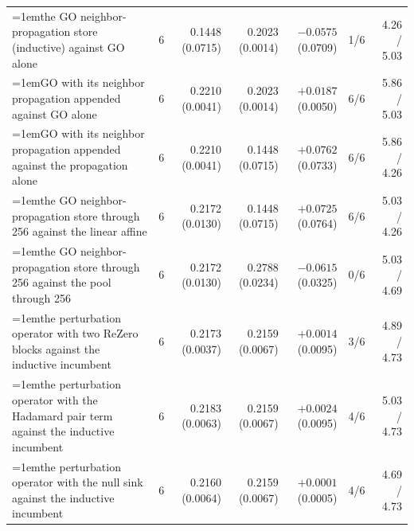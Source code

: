 \begin{table}[H]
\begin{tabular}{@{}>{\raggedright\hangindent=1em\hangafter=1\arraybackslash}p{78.5mm}rrrrrr@{}}
    the GO neighbor-propagation store (inductive) against GO alone & 6 & 0.1448 (0.0715) & 0.2023 (0.0014) & $-0.0575$ (0.0709) & 1/6 & 4.26 / 5.03 \\
    GO with its neighbor propagation appended against GO alone & 6 & 0.2210 (0.0041) & 0.2023 (0.0014) & $+0.0187$ (0.0050) & 6/6 & 5.86 / 5.03 \\
    GO with its neighbor propagation appended against the propagation alone & 6 & 0.2210 (0.0041) & 0.1448 (0.0715) & $+0.0762$ (0.0733) & 6/6 & 5.86 / 4.26 \\
    the GO neighbor-propagation store through 256 against the linear affine & 6 & 0.2172 (0.0130) & 0.1448 (0.0715) & $+0.0725$ (0.0764) & 6/6 & 5.03 / 4.26 \\
    the GO neighbor-propagation store through 256 against the pool through 256 & 6 & 0.2172 (0.0130) & 0.2788 (0.0234) & $-0.0615$ (0.0325) & 0/6 & 5.03 / 4.69 \\
    the perturbation operator with two ReZero blocks against the inductive incumbent & 6 & 0.2173 (0.0037) & 0.2159 (0.0067) & $+0.0014$ (0.0095) & 3/6 & 4.89 / 4.73 \\
    the perturbation operator with the Hadamard pair term against the inductive incumbent & 6 & 0.2183 (0.0063) & 0.2159 (0.0067) & $+0.0024$ (0.0095) & 4/6 & 5.03 / 4.73 \\
    the perturbation operator with the null sink against the inductive incumbent & 6 & 0.2160 (0.0064) & 0.2159 (0.0067) & $+0.0001$ (0.0005) & 4/6 & 4.69 / 4.73 \\
    \hline
  \end{tabular}
\end{table}

